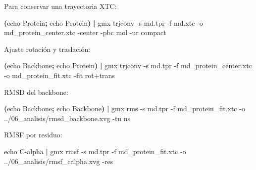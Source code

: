 \documentclass[
  spanish,
  11pt,
  a4paper]{article}
\newenvironment{Shaded}{\begin{snugshade}}{\end{snugshade}}
\newcommand{\AttributeTok}[1]{\textcolor[rgb]{0.13,0.29,0.53}{#1}}
\newcommand{\BuiltInTok}[1]{#1}
\newcommand{\ExtensionTok}[1]{#1}
\newcommand{\KeywordTok}[1]{\textcolor[rgb]{0.13,0.29,0.53}{\textbf{#1}}}
\newcommand{\NormalTok}[1]{#1}
\begin{document}
Para conservar una trayectoria XTC:

\begin{Shaded}
\begin{Highlighting}[]
\KeywordTok{(}\BuiltInTok{echo}\NormalTok{ Protein}\KeywordTok{;} \BuiltInTok{echo}\NormalTok{ Protein}\KeywordTok{)} \KeywordTok{|}
\ExtensionTok{gmx}\NormalTok{ trjconv     }\AttributeTok{{-}s}\NormalTok{ md.tpr     }\AttributeTok{{-}f}\NormalTok{ md.xtc     }\AttributeTok{{-}o}\NormalTok{ md\_protein\_center.xtc     }\AttributeTok{{-}center}     \AttributeTok{{-}pbc}\NormalTok{ mol     }\AttributeTok{{-}ur}\NormalTok{ compact}
\end{Highlighting}
\end{Shaded}

Ajuste rotación y traslación:

\begin{Shaded}
\begin{Highlighting}[]
\KeywordTok{(}\BuiltInTok{echo}\NormalTok{ Backbone}\KeywordTok{;} \BuiltInTok{echo}\NormalTok{ Protein}\KeywordTok{)} \KeywordTok{|}
\ExtensionTok{gmx}\NormalTok{ trjconv     }\AttributeTok{{-}s}\NormalTok{ md.tpr     }\AttributeTok{{-}f}\NormalTok{ md\_protein\_center.xtc     }\AttributeTok{{-}o}\NormalTok{ md\_protein\_fit.xtc     }\AttributeTok{{-}fit}\NormalTok{ rot+trans}
\end{Highlighting}
\end{Shaded}

RMSD del backbone:

\begin{Shaded}
\begin{Highlighting}[]
\KeywordTok{(}\BuiltInTok{echo}\NormalTok{ Backbone}\KeywordTok{;} \BuiltInTok{echo}\NormalTok{ Backbone}\KeywordTok{)} \KeywordTok{|}
\ExtensionTok{gmx}\NormalTok{ rms     }\AttributeTok{{-}s}\NormalTok{ md.tpr     }\AttributeTok{{-}f}\NormalTok{ md\_protein\_fit.xtc     }\AttributeTok{{-}o}\NormalTok{ ../06\_analisis/rmsd\_backbone.xvg     }\AttributeTok{{-}tu}\NormalTok{ ns}
\end{Highlighting}
\end{Shaded}

RMSF por residuo:

\begin{Shaded}
\begin{Highlighting}[]
\BuiltInTok{echo}\NormalTok{ C{-}alpha }\KeywordTok{|}
\ExtensionTok{gmx}\NormalTok{ rmsf     }\AttributeTok{{-}s}\NormalTok{ md.tpr     }\AttributeTok{{-}f}\NormalTok{ md\_protein\_fit.xtc     }\AttributeTok{{-}o}\NormalTok{ ../06\_analisis/rmsf\_calpha.xvg     }\AttributeTok{{-}res}
\end{Highlighting}
\end{Shaded}
\end{document}
